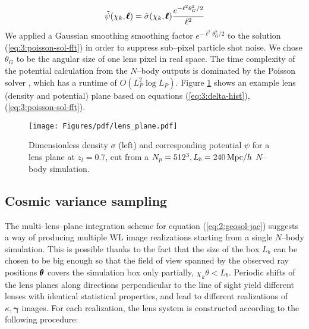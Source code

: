 \begin{equation}
\label{eq:3:poisson-sol-fft}
\tilde{\psi}(\chi_k,\pmb{\ell}) = \tilde{\sigma}(\chi_k,\pmb{\ell})\frac{e^{-\ell^2\theta_G^2/2}}{\ell^2}
\end{equation} 
%
We applied a Gaussian smoothing smoothing factor $e^{-\ell^2\theta_G^2/2}$ to the solution (\ref{eq:3:poisson-sol-fft}) in order to suppress sub--pixel particle shot noise. We chose $\theta_G$ to be the angular size of one lens pixel in real space. The time complexity of the potential calculation from the $N$--body outputs is dominated by the Poisson solver \citep{lenstools}, which has a runtime of $O(L_P^2\log L_P)$. Figure \ref{fig:3:lens} shows an example lens (density and potential) plane based on equations (\ref{eq:3:delta-hist}), (\ref{eq:3:poisson-sol-fft}). 

\begin{figure}
\begin{center}
\texttt{[image: Figures/pdf/lens\_plane.pdf]}
\end{center}
\caption{Dimensionless density $\sigma$ (left) and corresponding potential $\psi$ for a lens plane at $z_l=0.7$, cut from a $N_p=512^3, L_b=240\,{\rm Mpc}/h$ $N$--body simulation.}
\label{fig:3:lens}
\end{figure}

\subsection{Cosmic variance sampling}
\label{sec:3:sampling}
The multi--lens--plane integration scheme for equation (\ref{eq:2:geosol-jac}) suggests a way of producing multiple WL image realizations starting from a single $N$--body simulation. This is possible thanks to the fact that the size of the box $L_b$ can be chosen to be big enough so that the field of view spanned by the observed ray positions $\pmb{\theta}$ covers the simulation box only partially, $\chi_k\theta<L_b$. Periodic shifts of the lens planes along directions perpendicular to the line of sight yield different lenses with identical statistical properties, and lead to different realizations of $\kappa,\pmb{\gamma}$ images. For each realization, the lens system is constructed according to the following procedure:

